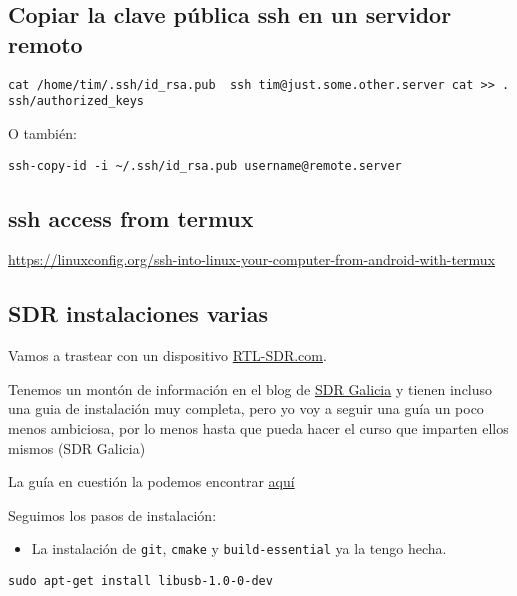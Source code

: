 \documentclass[
  12pt,
  spanish,
]{article}
\providecommand{\tightlist}{%
  \setlength{\itemsep}{0pt}\setlength{\parskip}{0pt}}
\begin{document}
\hypertarget{copiar-la-clave-puxfablica-ssh-en-un-servidor-remoto}{%
\subsection{Copiar la clave pública ssh en un servidor
remoto}\label{copiar-la-clave-puxfablica-ssh-en-un-servidor-remoto}}

\texttt{cat\ /home/tim/.ssh/id\_rsa.pub\ \textbar{}\ ssh\ tim@just.some.other.server\ \textquotesingle{}cat\ \textgreater{}\textgreater{}\ .ssh/authorized\_keys\textquotesingle{}}

O también:

\texttt{ssh-copy-id\ -i\ \textasciitilde{}/.ssh/id\_rsa.pub\ username@remote.server}

\hypertarget{ssh-access-from-termux}{%
\subsection{ssh access from termux}\label{ssh-access-from-termux}}

\url{https://linuxconfig.org/ssh-into-linux-your-computer-from-android-with-termux}

\hypertarget{sdr-instalaciones-varias}{%
\subsection{SDR instalaciones varias}\label{sdr-instalaciones-varias}}

Vamos a trastear con un dispositivo
\href{https://www.rtl-sdr.com/}{RTL-SDR.com}.

Tenemos un montón de información en el blog de
\href{https://sdrgal.wordpress.com/}{SDR Galicia} y tienen incluso una
guia de instalación muy completa, pero yo voy a seguir una guía un poco
menos ambiciosa, por lo menos hasta que pueda hacer el curso que
imparten ellos mismos (SDR Galicia)

La guía en cuestión la podemos encontrar
\href{https://ranous.wordpress.com/rtl-sdr4linux/}{aquí}

Seguimos los pasos de instalación:

\begin{itemize}
\tightlist
\item
  La instalación de \texttt{git}, \texttt{cmake} y
  \texttt{build-essential} ya la tengo hecha.
\end{itemize}

\begin{verbatim}
sudo apt-get install libusb-1.0-0-dev
\end{verbatim}
\end{document}
